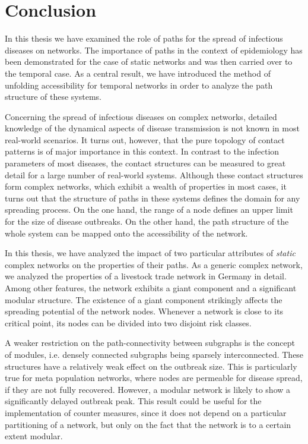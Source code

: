\chapter{Conclusion}
In this thesis we have examined the role of paths for the spread of infectious diseases on networks.
The importance of paths in the context of epidemiology has been demonstrated for the case of static networks and was then carried over to the temporal case.
As a central result, we have introduced the method of unfolding accessibility for temporal networks in order to analyze the path structure of these systems.

Concerning the spread of infectious diseases on complex networks, detailed knowledge of the dynamical aspects of disease transmission is not known in most real-world scenarios.
It turns out, however, that the pure topology of contact patterns is of major importance in this context.
In contrast to the infection parameters of most diseases, the contact structures can be measured to great detail for a large number of real-world systems.
Although these contact structures form complex networks, which exhibit a wealth of properties in most cases, it turns out that the structure of paths in these systems defines the domain for any spreading process.
On the one hand, the range of a node defines an upper limit for the size of disease outbreaks.
On the other hand, the path structure of the whole system can be mapped onto the accessibility of the network.

In this thesis, we have analyzed the impact of two particular attributes of \emph{static} complex networks on the properties of their paths.
As a generic complex network, we analyzed the properties of a livestock trade network in Germany in detail.
Among other features, the network exhibits a giant component and a significant modular structure.
The existence of a giant component strikingly affects the spreading potential of the network nodes.
Whenever a network is close to its critical point, its nodes can be divided into two disjoint risk classes.

A weaker restriction on the path-connectivity between subgraphs is the concept of modules, i.e. densely connected subgraphs being sparsely interconnected.
These structures have a relatively weak effect on the outbreak size.
This is particularly true for meta population networks, where nodes are permeable for disease spread, if they are not fully recovered.
However, a modular network is likely to show a significantly delayed outbreak peak.
This result could be useful for the implementation of counter measures, since it does not depend on a particular partitioning of a network, but only on the fact that the network is to a certain extent modular.

